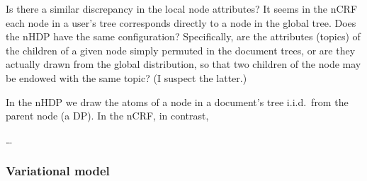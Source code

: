 \documentclass{article}
\begin{document}
Is there a similar discrepancy in the local node attributes?  It seems in the nCRF each node in a user's tree corresponds directly to a node in the global tree.  Does the nHDP have the same configuration?  Specifically, are the attributes (topics) of the children of a given node simply permuted in the document trees, or are they actually drawn from the global distribution, so that two children of the node may be endowed with the same topic?  (I suspect the latter.)

In the nHDP we draw the atoms of a node in a document's tree i.i.d.\ from the parent node (a DP).  In the nCRF, in contrast,

\ldots


\subsubsection*{Variational model}





\end{document}
